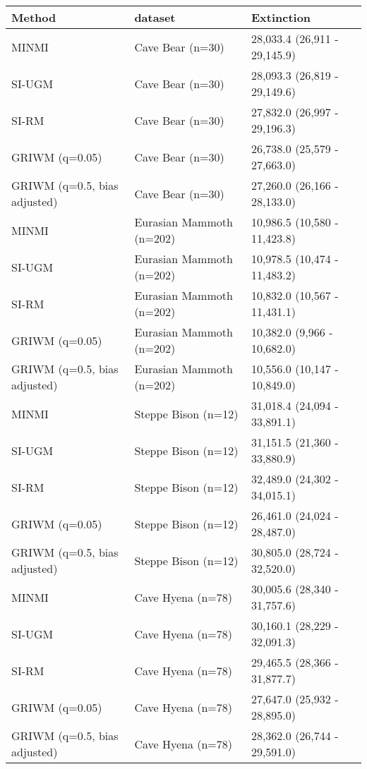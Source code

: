 
\begin{tabular}{lll}
\toprule
Method & dataset & Extinction\\
\midrule
MINMI & Cave Bear (n=30) & 28,033.4 (26,911 - 29,145.9)\\
SI-UGM & Cave Bear (n=30) & 28,093.3 (26,819 - 29,149.6)\\
SI-RM & Cave Bear (n=30) & 27,832.0 (26,997 - 29,196.3)\\
GRIWM (q=0.05) & Cave Bear (n=30) & 26,738.0 (25,579 - 27,663.0)\\
GRIWM (q=0.5, bias adjusted) & Cave Bear (n=30) & 27,260.0 (26,166 - 28,133.0)\\
\addlinespace
MINMI & Eurasian Mammoth (n=202) & 10,986.5 (10,580 - 11,423.8)\\
SI-UGM & Eurasian Mammoth (n=202) & 10,978.5 (10,474 - 11,483.2)\\
SI-RM & Eurasian Mammoth (n=202) & 10,832.0 (10,567 - 11,431.1)\\
GRIWM (q=0.05) & Eurasian Mammoth (n=202) & 10,382.0 (9,966 - 10,682.0)\\
GRIWM (q=0.5, bias adjusted) & Eurasian Mammoth (n=202) & 10,556.0 (10,147 - 10,849.0)\\
\addlinespace
MINMI & Steppe Bison (n=12) & 31,018.4 (24,094 - 33,891.1)\\
SI-UGM & Steppe Bison (n=12) & 31,151.5 (21,360 - 33,880.9)\\
SI-RM & Steppe Bison (n=12) & 32,489.0 (24,302 - 34,015.1)\\
GRIWM (q=0.05) & Steppe Bison (n=12) & 26,461.0 (24,024 - 28,487.0)\\
GRIWM (q=0.5, bias adjusted) & Steppe Bison (n=12) & 30,805.0 (28,724 - 32,520.0)\\
\addlinespace
MINMI & Cave Hyena (n=78) & 30,005.6 (28,340 - 31,757.6)\\
SI-UGM & Cave Hyena (n=78) & 30,160.1 (28,229 - 32,091.3)\\
SI-RM & Cave Hyena (n=78) & 29,465.5 (28,366 - 31,877.7)\\
GRIWM (q=0.05) & Cave Hyena (n=78) & 27,647.0 (25,932 - 28,895.0)\\
GRIWM (q=0.5, bias adjusted) & Cave Hyena (n=78) & 28,362.0 (26,744 - 29,591.0)\\
\bottomrule
\end{tabular}
